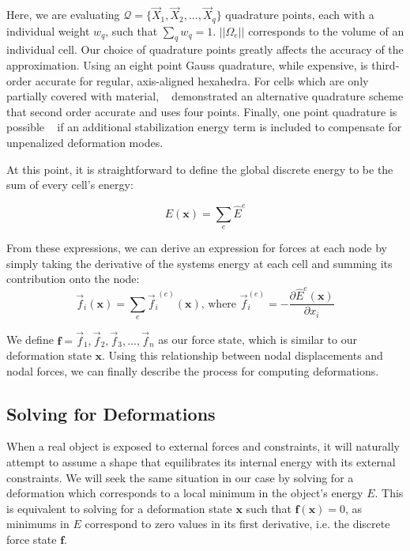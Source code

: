 Here, we are evaluating $\mathcal Q = \{\vec{X}_1,\vec{X}_2,...,\vec{X}_q\}$
quadrature points, each with a individual weight $w_q$, such that
$\sum_q w_q = 1$. $||\Omega_e||$ corresponds to the volume of an
individual cell. Our choice of quadrature points greatly affects the
accuracy of the approximation. Using an eight point Gauss quadrature,
while expensive, is third-order accurate for regular, axis-aligned
hexahedra. For cells which are only partially covered with material,
~\cite{PatteMS:2012} demonstrated an alternative quadrature scheme that
second order accurate and uses four points. Finally, one point quadrature is possible
~\citep{McAdaZSETTS:2011} if an additional stabilization energy term is
included to compensate for unpenalized deformation modes.

At this point, it is straightforward to define the global discrete
energy to be the sum of every cell's energy:

\begin{equation}
  E(\mathbf x) = \sum_e \hat{E}^{e} 
\end{equation}

From these expressions, we can derive an expression for forces at each
node by simply taking the derivative of the systems energy at each
cell and summing its contribution onto the node:
\begin{equation}
  \label{equ:discreteforces}
  \vec{f}_i(\mathbf x) = \sum_{e} \vec{f}_i^{\;(e)}(\mathbf x)
  \text{, where } \vec{f}_i^{(e)} = - \frac{\partial \hat{E}^{e}(\mathbf x)}{\partial x_i}
\end{equation}

We define $\mathbf f = {\vec{f}_1, \vec{f}_2, \vec{f}_3, \ldots, \vec{f}_n}$ as
our force state, which is similar to our deformation state $\mathbf x$.
Using this relationship between nodal displacements and nodal forces,
we can finally describe the process for computing deformations.


\subsection{Solving for Deformations}

When a real object is exposed to external forces and constraints, it
will naturally attempt to assume a shape that equilibrates its
internal energy with its external constraints. We will seek the same
situation in our case by solving for a deformation which corresponds
to a local minimum in the object's energy $E$. This is equivalent to
solving for a deformation state $\mathbf{x}$ such that
$\mathbf{f}(\mathbf{x}) = 0$, as minimums in $E$ correspond to zero
values in its first derivative, i.e. the discrete force state
$\mathbf{f}$.


